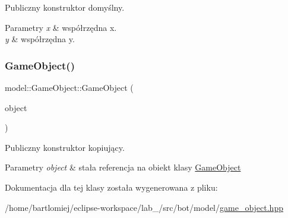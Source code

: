 Publiczny konstruktor domyślny. 


\begin{DoxyParams}{Parametry}
{\em x} & współrzędna x. \\
\hline
{\em y} & współrzędna y. \\
\hline
\end{DoxyParams}
\mbox{\label{classmodel_1_1GameObject_add23441faffd638c0cba4950b8555364}} 
\subsubsection{\texorpdfstring{Game\+Object()}{GameObject()}\hspace{0.1cm}{\footnotesize\ttfamily [2/2]}}
{\footnotesize\ttfamily model\+::\+Game\+Object\+::\+Game\+Object (\begin{DoxyParamCaption}\item[{const \hyperlink{classmodel_1_1GameObject}{Game\+Object} \&}]{object }\end{DoxyParamCaption})\hspace{0.3cm}{\ttfamily [inline]}}



Publiczny konstruktor kopiujący. 


\begin{DoxyParams}{Parametry}
{\em object} & stała referencja na obiekt klasy \hyperlink{classmodel_1_1GameObject}{Game\+Object} \\
\hline
\end{DoxyParams}


Dokumentacja dla tej klasy została wygenerowana z pliku\+:\begin{DoxyCompactItemize}
\item 
/home/bartlomiej/eclipse-\/workspace/lab\+\_/src/bot/model/\hyperlink{game__object_8hpp}{game\+\_\+object.\+hpp}\end{DoxyCompactItemize}
